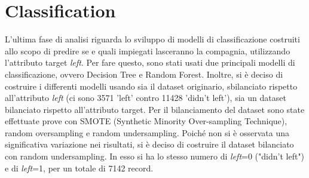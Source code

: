 \section{Classification}
	L’ultima fase di analisi riguarda lo sviluppo di modelli di classificazione costruiti allo scopo di predire se e quali impiegati lasceranno la compagnia, utilizzando l’attributo target \textit{left}. Per fare questo, sono stati usati due principali modelli di classificazione, ovvero Decision Tree e Random Forest. Inoltre, si è deciso di costruire i differenti modelli usando sia il dataset originario, sbilanciato rispetto all’attributo \textit{left} (ci sono 3571 'left' contro 11428 'didn’t left'), sia un dataset bilanciato rispetto all’attributo target. Per il bilanciamento del dataset sono state effettuate prove con  SMOTE (Synthetic Minority Over-sampling Technique), random oversampling e random undersampling. Poiché non si è osservata una significativa variazione nei risultati, si è deciso di costruire il dataset bilanciato con random undersampling. In esso si ha lo stesso numero di \textit{left}=0 ("didn’t left") e di \textit{left}=1, per un totale di 7142 record.

